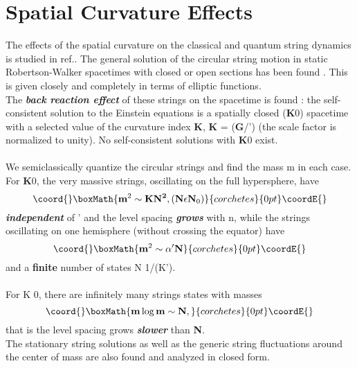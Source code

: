 \documentclass[12pt,a4paper]{article}
\begin{document}
\section{Spatial Curvature Effects}
The effects of the spatial curvature on the classical and quantum string 
dynamics is studied in ref.\cite{ls4}. The general solution of the circular 
string motion in static Robertson-Walker spacetimes with closed or open 
sections has been found \cite{ls4}. 
This is given closely and completely in terms of elliptic functions.\\
The {\it \bf back reaction effect} of these strings on the spacetime is 
found : the self-consistent solution to the Einstein equations is a spatially 
closed ({\bf K}\myHighlight{$>$}\coordHE{}0) spacetime with a selected value of the curvature index {\bf K}, {\bf K} = ({\bf G}/\myHighlight{${\bf \alpha}$}\coordHE{}')\coordHE{} (the scale factor is normalized to unity). No self-consistent solutions with {\bf K}\myHighlight{$<$}\coordHE{}0 exist. \\ \\ We semiclassically quantize the circular 
strings and find the mass m in each case. For {\bf K}\myHighlight{$>$}\coordHE{}0, the very 
massive strings, oscillating on the full hypersphere, have 
\begin{displaymath}\coord{}\boxMath{
{\bf m}^2 \sim {\bf K} {\bf N^2}, ({\bf N} {\bf \epsilon}  
{\bf N}_0 )
}{corchetes}{0pt}\coordE{}\end{displaymath}
 {\it \bf independent} of \myHighlight{${\bf \alpha}$}\coordHE{}' and the 
level spacing {\it \bf grows} with n, while the strings oscillating on 
one hemisphere (without crossing the equator) have 
\begin{displaymath}\coord{}\boxMath{
{\bf m}^2 \sim {\bf \alpha}' {\bf N}
}{corchetes}{0pt}\coordE{}\end{displaymath}
 and a {\bf finite} number of states 
N \myHighlight{$\sim$}\coordHE{} 1/(K\myHighlight{${\bf \alpha}$}\coordHE{}'). \\ \\For K \myHighlight{$<$}\coordHE{}0, there are infinitely many 
strings states with masses
\begin{displaymath}\coord{}\boxMath{ 
{\bf m}\,{\bf \log}\, {\bf m} \sim {\bf N},
}{corchetes}{0pt}\coordE{}\end{displaymath} 
that is the level spacing grows {\it \bf slower} than {\bf N}.\\The stationary string solutions as well as the generic 
string fluctuations around the center of mass are also found and analyzed in 
closed form.
\end{document}
